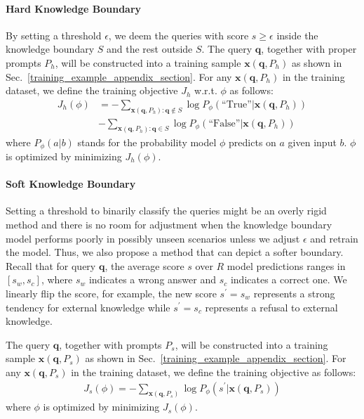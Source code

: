 \paragraph{Hard Knowledge Boundary} By setting a threshold $\epsilon$, we deem the queries with score $s \geq \epsilon$ inside the knowledge boundary $S$ and the rest outside $S$. The query $\bm{q}$, together with proper prompts $P_h$, will be constructed into a training sample $\bm{x}(\bm{q}, P_h)$ as shown in Sec.~\ref{training_example_appendix_section}. For any $\bm{x}(\bm{q}, P_h)$ in the training dataset, we define the training objective $J_h$ w.r.t. $\phi$ as follows: 
\begin{equation}
\label{objective_hard}
    \begin{aligned}
    J_h (\phi) &= - \sum\limits_{\bm{x}(\bm{q}, P_h): \bm{q} \notin S} \log P_\phi(\text{``True''}|\bm{x}(\bm{q}, P_h)) \\
    &- \sum\limits_{\bm{x}(\bm{q}, P_h): \bm{q} \in S} \log P_\phi(\text{``False''}|\bm{x}(\bm{q}, P_h))
    \end{aligned}
\end{equation}
where $P_\phi(a|b)$ stands for the probability model $\phi$ predicts on $a$ given input $b$. $\phi$ is optimized by minimizing $J_h(\phi)$.


\paragraph{Soft Knowledge Boundary}
Setting a threshold to binarily classify the queries might be an overly rigid method and there is no room for adjustment when the knowledge boundary model performs poorly in possibly unseen scenarios unless we adjust $\epsilon$ and retrain the model. Thus, we also propose a method that can depict a softer boundary. Recall that for query $\bm{q}$, the average score $s$ over $R$ model predictions ranges in $[s_w, s_c]$, where $s_w$ indicates a wrong answer and $s_c$ indicates a correct one. We linearly flip the score, for example, the new score $s^{'}=s_w$ represents a strong tendency for external knowledge while $s^{'}=s_c$ represents a refusal to external knowledge. 


The query $\bm{q}$, together with prompts $P_s$, will be constructed into a training sample $\bm{x}(\bm{q}, P_s)$ as shown in Sec.~\ref{training_example_appendix_section}. For any $\bm{x}(\bm{q}, P_s)$ in the training dataset, we define the training objective as follows:
\begin{align}\label{objective_soft}
J_s(\phi) = - \sum\limits_{\bm{x}(\bm{q}, P_s)} \log P_\phi(s^{'}|\bm{x}(\bm{q}, P_s))
\end{align}
where $\phi$ is optimized by minimizing $J_s(\phi)$.


